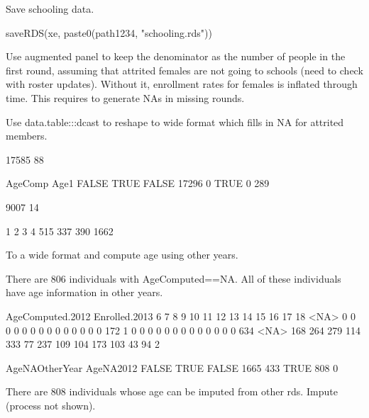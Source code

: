 Save schooling data.
\begin{Schunk}
\begin{Sinput}
saveRDS(xe, paste0(path1234, "schooling.rds"))
\end{Sinput}
\end{Schunk}


Use augmented panel to keep the denominator as the number of people in the first round, assuming that attrited females are not going to schools (need to check with roster updates). Without it, enrollment rates for females is inflated through time. This requires to generate NAs in missing rounds. 
\begin{dinglist}{43}
\vspace{1.0ex}\setlength{\itemsep}{1.0ex}\setlength{\baselineskip}{12pt}
\item	Use \textsf{data.table:::dcast} to reshape to wide format which fills in NA for attrited members.
\end{dinglist}
\gobblepars
\begin{Schunk}
\begin{Soutput}
[1] 17585    88
\end{Soutput}
\begin{Soutput}
       AgeComp
Age1    FALSE  TRUE
  FALSE 17296     0
  TRUE      0   289
\end{Soutput}
\end{Schunk}
\begin{Schunk}
\begin{Soutput}
[1] 9007   14
\end{Soutput}
\begin{Soutput}

   1    2    3    4 
 515  337  390 1662 
\end{Soutput}
\end{Schunk}

To a wide format and compute age using other years.
\begin{Schunk}
\end{Schunk}
There are 806 individuals with \textsf{AgeComputed}==NA. All of these individuals have age information in other years.
\begin{Schunk}
\begin{Soutput}
             AgeComputed.2012
Enrolled.2013   6   7   8   9  10  11  12  13  14  15  16  17  18 <NA>
         0      0   0   0   0   0   0   0   0   0   0   0   0   0  172
         1      0   0   0   0   0   0   0   0   0   0   0   0   0  634
         <NA> 168 264 279 114 333  77 237 109 104 173 103  43  94    2
\end{Soutput}
\begin{Soutput}
         AgeNAOtherYear
AgeNA2012 FALSE TRUE
    FALSE  1665  433
    TRUE    808    0
\end{Soutput}
\end{Schunk}
There are 808 individuals whose age can be imputed from other rds. Impute (process not shown).

